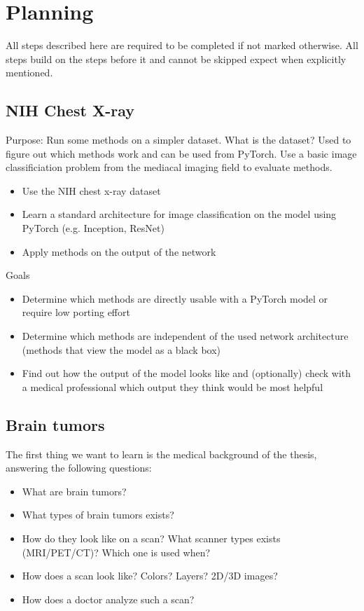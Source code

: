 \section{Planning}
All steps described here are required to be completed if not marked otherwise. All steps build on the steps before it and cannot be skipped expect when explicitly mentioned.

\subsection{NIH Chest X-ray}
Purpose: Run some methods on a simpler dataset.
What is the dataset?
Used to figure out which methods work and can be used from PyTorch.
Use a basic image classificiation problem from the mediacal imaging field to evaluate methods.
\begin{itemize}
    \item Use the NIH chest x-ray dataset
    \item Learn a standard architecture for image classification on the model using PyTorch (e.g. Inception, ResNet)
    \item Apply methods on the output of the network
\end{itemize}


Goals
\begin{itemize}
    \item Determine which methods are directly usable with a PyTorch model or require low porting effort
    \item Determine which methods are independent of the used network architecture (methods that view the model as a black box)
    \item Find out how the output of the model looks like and (optionally) check with a medical professional which output they think would be most helpful
\end{itemize}


\subsection{Brain tumors}
The first thing we want to learn is the medical background of the thesis, answering the following questions:
\begin{itemize}
    \item What are brain tumors?
    \item What types of brain tumors exists?
    \item How do they look like on a scan? What scanner types exists (MRI/PET/CT)? Which one is used when?
    \item How does a scan look like? Colors? Layers? 2D/3D images?
    \item How does a doctor analyze such a scan?
\end{itemize}

